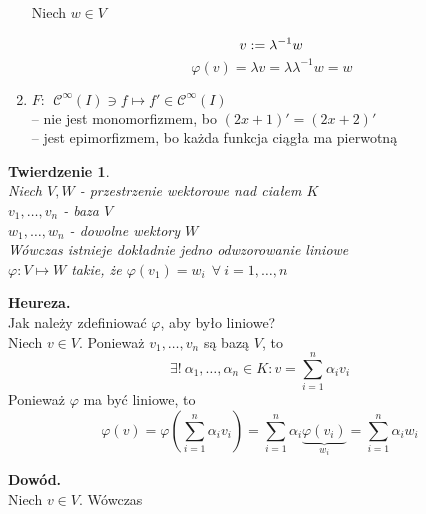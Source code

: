\documentclass[a5paper,8pt]{article}
\newtheorem{theorem}{Twierdzenie}[section]
\newcommand\tab[1][1cm]{\hspace*{#1}}
\begin{document}
\begin{enumerate}[label=\textbf{\arabic*})]
            Niech $ w \in V $

            \begin{equation*}
                    v := \lambda^{-1} w \\
            \end{equation*}
            \begin{equation*}
                \varphi(v) = \lambda v = \lambda \lambda^{-1} w = w
            \end{equation*}

        \item
            $ F:~~ \mathcal{C}^\infty(I) \ni f \longmapsto f' \in \mathcal{C}^\infty(I) $ \\
            -- nie jest monomorfizmem, bo $ (2x+1)' = (2x+2)' $ \\
            -- jest epimorfizmem, bo każda funkcja ciągła ma pierwotną
    \end{enumerate}

    \newpage
    \begin{theorem} \hfill \\
        Niech $ V, W $ - przestrzenie wektorowe nad ciałem $ K $ \\
        \tab $v_1, \ldots, v_n$ - baza $V$ \\
        \tab $w_1, \ldots, w_n$ - dowolne wektory $W$ \\
        Wówczas istnieje dokładnie jedno odwzorowanie liniowe \\
        \tab $ \varphi : V \longmapsto W $ takie, że $ \varphi(v_1) = w_i ~~ \forall ~i = 1, \ldots, n $
    \end{theorem}

    \large{\textbf{Heureza.}} \\
    Jak należy zdefiniować $ \varphi $, aby było liniowe? \\
    Niech $ v \in V $. Ponieważ $ v_1, \ldots, v_n $ są bazą $ V $, to
    \begin{equation*}
        \exists!~ \alpha_1, \ldots, \alpha_n \in K: v = \sum_{i = 1}^{n} \alpha_i v_i
    \end{equation*}
    Ponieważ $ \varphi $ ma być liniowe, to
    \begin{equation*}
        \varphi(v) = \varphi( \sum_{i = 1}^{n} \alpha_i v_i )
        = \sum_{i = 1}^{n} \alpha_i \underbrace{\varphi(v_i)}_{w_i} = \sum_{i = 1}^{n} \alpha_i w_i
    \end{equation*}

    \large{\textbf{Dowód.}} \\
    Niech $ v \in V $. Wówczas
\end{document}
